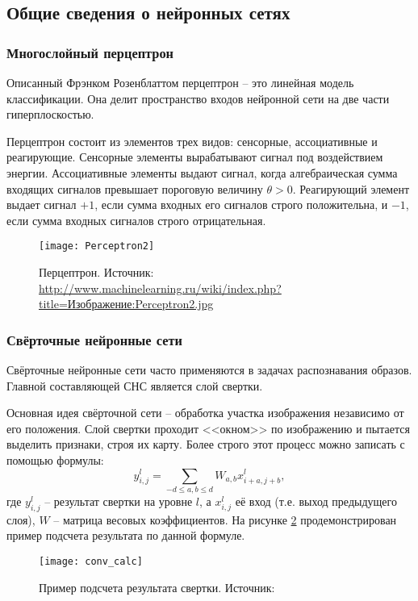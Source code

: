 \subsection{Общие сведения о нейронных сетях}
\subsubsection{Многослойный перцептрон}
Описанный Фрэнком Розенблаттом перцептрон -- это линейная модель классификации.
Она делит пространство входов нейронной сети на две части гиперплоскостью\cite{Rosenblatt1958}.

Перцептрон состоит из элементов трех видов: сенсорные, ассоциативные и
реагирующие. Сенсорные элементы вырабатывают сигнал под воздействием энергии.
Ассоциативные элементы выдают сигнал, когда алгебраическая сумма входящих
сигналов превышает пороговую величину $\theta > 0$. Реагирующий элемент выдает
сигнал $+1$, если сумма входных его сигналов строго положительна, и $-1$, если
сумма входных сигналов строго отрицательная.
\begin{figure}[h]
\centering
\texttt{[image: Perceptron2]}
\caption{Перцептрон. Источник: \url{http://www.machinelearning.ru/wiki/index.php?title=Изображение:Perceptron2.jpg}}
\label{fig:perceptron}
\end{figure}
\subsubsection{Свёрточные нейронные сети}
Свёрточные нейронные сети часто применяются в задачах распознавания образов.
Главной составляющей СНС является слой свертки.

Основная идея свёрточной сети -- обработка участка изображения независимо от
его положения. Слой свертки проходит <<окном>> по изображению и пытается
выделить признаки, строя их карту. Более строго этот процесс можно записать
с помощью формулы:
\[
y^{l}_{i, j} = \sum_{-d \leq a, b \leq d} W_{a,b}x^l_{i + a, j + b},
\]
где $y^l_{i, j}$ -- результат свертки на уровне $l$, а $x^l_{i, j}$ её вход (т.е.
выход предыдущего слоя), $W$ -- матрица весовых коэффициентов\cite{deeplearning}. 
На рисунке \ref{fig:conv_calc} продемонстрирован пример подсчета результата по 
данной формуле.
\begin{figure}[h]
\centering
\texttt{[image: conv\_calc]}
\caption{Пример подсчета результата свертки. Источник: \cite{deeplearning}}
\label{fig:conv_calc}
\end{figure}

